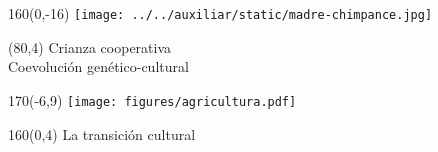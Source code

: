 \documentclass[shownotes,aspectratio=169]{beamer}
\begin{document}
\begin{frame}[plain]

\begin{textblock}{160}(0,-16)
\texttt{[image: ../../auxiliar/static/madre-chimpance.jpg]}
\end{textblock}

\begin{textblock}{80}(80,4)
 \centering \LARGE Crianza cooperativa \\
 \Large Coevolución genético-cultural
\end{textblock}
\vspace{1cm}

\end{frame}


\begin{frame}[plain]

\begin{textblock}{170}(-6,9)
\centering
\texttt{[image: figures/agricultura.pdf]} \ \ \ \ \
\end{textblock}

\begin{textblock}{160}(0,4)
 \centering \LARGE La transición cultural
\end{textblock}
\vspace{0.3cm}


\end{frame}
\end{document}
